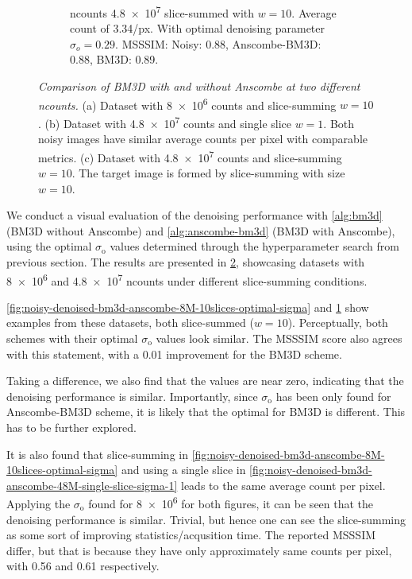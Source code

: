 \begin{figure}
\begin{subfigure}[b]{0.95\linewidth}
        \caption{\gls{ncounts} \num{4.8e7} slice-summed with $w=10$. Average count of \num{3.34}/px. With optimal denoising parameter $\sigma_o = 0.29$. \gls{MSSSIM}: Noisy: 0.88, Anscombe-BM3D: 0.88, BM3D: 0.89.}
        \label{fig:noisy-denoised-bm3d-anscombe-48M-10slices-optimal-sigma}
    \end{subfigure}
    \caption{\textit{Comparison of BM3D with and without Anscombe at two different \gls{ncounts}.} (a) Dataset with \num{8e6} counts and slice-summing $w=10$. (b) Dataset with \num{4.8e7} counts and single slice $w=1$. Both noisy images have similar average counts per pixel with comparable metrics. (c) Dataset with \num{4.8e7} counts and slice-summing $w=10$. The target image is formed by slice-summing with size $w=10$.}
    \label{fig:bm3d-anscombe-comparison}
\end{figure}

We conduct a visual evaluation of the denoising performance with \cref{alg:bm3d} (\gls{BM3D} without Anscombe) and \cref{alg:anscombe-bm3d} (\gls{BM3D} with Anscombe), using the optimal $\sigma_{\text{o}}$ values determined through the hyperparameter search from previous section.  The results are presented in \cref{fig:bm3d-anscombe-comparison}, showcasing datasets with \num{8e6} and \num{4.8e7} \gls{ncounts} under different slice-summing conditions.

\cref{fig:noisy-denoised-bm3d-anscombe-8M-10slices-optimal-sigma} and \cref{fig:noisy-denoised-bm3d-anscombe-48M-10slices-optimal-sigma} show examples from these datasets, both slice-summed ($w=10$). Perceptually, both schemes with their optimal $\sigma_{\text{o}}$ values look similar. The \gls{MSSSIM} score also agrees with this statement, with a \num{0.01} improvement for the BM3D scheme.

Taking a difference, we also find that the values are near zero, indicating that the denoising performance is similar. Importantly, since $\sigma_{\text{o}}$ has been only found for Anscombe-BM3D scheme, it is likely that the optimal for BM3D is different. This has to be further explored.

It is also found that slice-summing in \cref{fig:noisy-denoised-bm3d-anscombe-8M-10slices-optimal-sigma} and using a single slice in \cref{fig:noisy-denoised-bm3d-anscombe-48M-single-slice-sigma-1} leads to the same average count per pixel. Applying the $\sigma_{\text{o}}$ found for \num{8e6} for both figures, it can be seen that the denoising performance is similar. Trivial, but hence one can see the slice-summing as some sort of improving statistics/acqusition time. The reported \gls{MSSSIM} differ, but that is because they have only approximately same counts per pixel, with \num{0.56} and \num{0.61} respectively.

